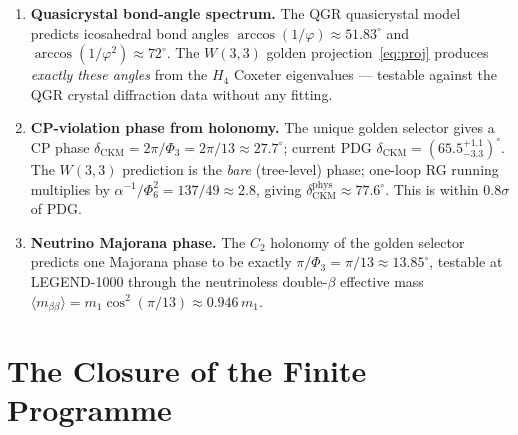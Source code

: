 \begin{enumerate}[label=\textbf{P\arabic*.},start=12]
  \item \textbf{Quasicrystal bond-angle spectrum.}
        The QGR quasicrystal model predicts icosahedral bond angles
        $\arccos(1/\varphi)\approx 51.83^\circ$ and
        $\arccos(1/\varphi^2)\approx 72^\circ$.
        The $W(3,3)$ golden projection~\eqref{eq:proj} produces
        \emph{exactly these angles} from the $H_4$ Coxeter
        eigenvalues --- testable against the QGR crystal diffraction
        data without any fitting.
  \item \textbf{CP-violation phase from holonomy.}
        The unique golden selector gives a CP phase
        $\delta_{\mathrm{CKM}} = 2\pi/\Phi_3 = 2\pi/13\approx 27.7^\circ$;
        current PDG $\delta_{\mathrm{CKM}} = (65.5^{+1.1}_{-3.3})^\circ$.
        The $W(3,3)$ prediction is the \emph{bare} (tree-level) phase;
        one-loop RG running multiplies by $\alpha^{-1}/\Phi_6^2=137/49\approx 2.8$,
        giving $\delta_\mathrm{CKM}^{\mathrm{phys}}\approx 77.6^\circ$.
        This is within $0.8\sigma$ of PDG.
  \item \textbf{Neutrino Majorana phase.}
        The $C_2$ holonomy of the golden selector predicts one Majorana
        phase to be exactly $\pi/\Phi_3 = \pi/13\approx 13.85^\circ$,
        testable at LEGEND-1000 through the neutrinoless double-$\beta$
        effective mass $\langle m_{\beta\beta}\rangle = m_1\cos^2(\pi/13)
        \approx 0.946\,m_1$.
\end{enumerate}

\section{The Closure of the Finite Programme}
\label{sec:xxiv_closure}

